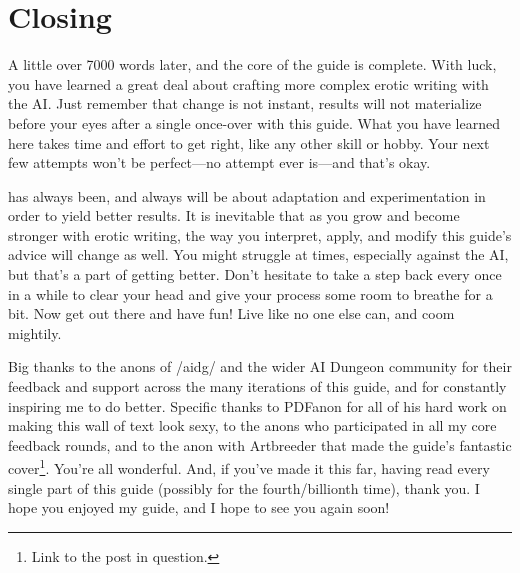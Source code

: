 ﻿\documentclass[Coomer-main.tex]{subfiles}
\begin{document}
\chapter{Closing}

A little over 7000 words later, and the core of the guide is complete. With luck, you have learned a great deal about crafting more complex erotic writing with the AI. Just remember that change is not instant, results will not materialize before your eyes after a single once-over with this guide. What you have learned here takes time and effort to get right, like any other skill or hobby. Your next few attempts won't be perfect—no attempt ever is—and that's okay.

\aid has always been, and always will be about adaptation and experimentation in order to yield better results. It is inevitable that as you grow and become stronger with erotic writing, the way you interpret, apply, and modify this guide's advice will change as well. You might struggle at times, especially against the AI, but that's a part of getting better. Don't hesitate to take a step back every once in a while to clear your head and give your process some room to breathe for a bit. Now get out there and have fun! Live like no one else can, and coom mightily.

Big thanks to the anons of /aidg/ and the wider AI Dungeon community for their feedback and support across the many iterations of this guide, and for constantly inspiring me to do better. Specific thanks to PDFanon for all of his hard work on making this wall of text look sexy, to the anons who participated in all my core feedback rounds, and to the anon with Artbreeder that made the guide’s fantastic cover\footnote{Link to the post in question.}. You're all wonderful. And, if you've made it this far, having read every single part of this guide (possibly for the fourth/billionth time), thank you. I hope you enjoyed my guide, and I hope to see you again soon!
\end{document}
